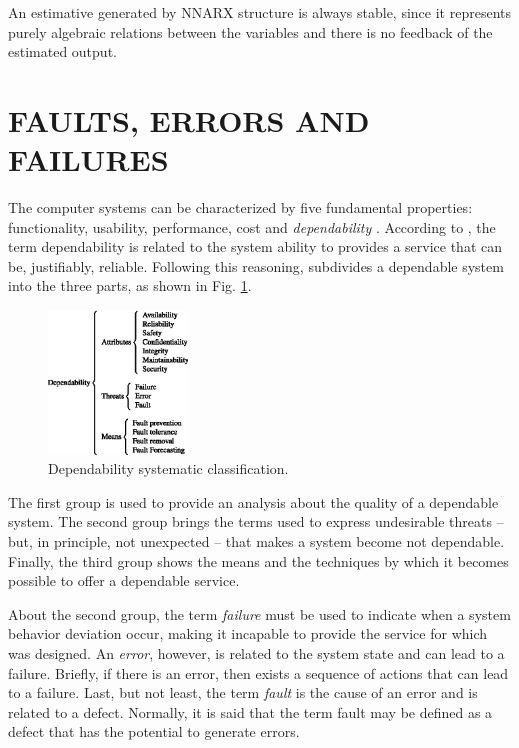 \documentclass[10pt,fleqn,a4paper]{article}
\begin{document}
An estimative generated by NNARX structure is always stable, since it represents
purely algebraic relations between the variables and there is no feedback of the
estimated output.

\section{FAULTS, ERRORS AND FAILURES}\label{sec:eff}
The computer systems can be characterized by five fundamental properties:
functionality, usability, performance, cost and {\it dependability}
\citep{kaaniche:2002}. According to \citet{laprie:1992}, the term dependability
is related to the system ability to provides a service that can be, justifiably,
reliable. Following this reasoning, \citet{avizienis:2000} subdivides a
dependable system into the three parts, as shown in Fig.
\ref{fig:div_avizienis}.

\begin{figure}[htb]
\centering
    \includegraphics[width=0.33\textwidth]{imgs/div_avizienis}
    \caption{Dependability systematic classification.}
    \label{fig:div_avizienis}
\end{figure}

The first group is used to provide an analysis about the quality of a dependable
system. The second group brings the terms used to express undesirable threats --
but, in principle, not unexpected -- that makes a system become not dependable.
Finally, the third group shows the means and the techniques by which it becomes
possible to offer a dependable service.

About the second group, the term {\it failure} must be used to indicate when
a system behavior deviation occur, making it incapable to provide the service
for which was designed. An {\it error}, however, is related to the system state
and can lead to a failure. Briefly, if there is an error, then exists a sequence
of actions that can lead to a failure. Last, but not least, the term {\it fault}
is the cause of an error and is related to a defect. Normally, it is said that
the term fault may be defined as a defect that has the potential to generate
errors.
\end{document}
